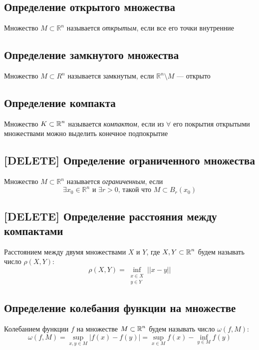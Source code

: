 \documentclass[a4paper]{article}
\begin{document}
\subsection{Определение открытого множества}
 Множество $M\subset\mathbb{R}^n$ называется \textit{открытым}, если все его точки внутренние

\subsection{Определение замкнутого множества}
 Множество $M\subset R^n$ называется замкнутым, если $\mathbb{R}^n\setminus M$ — открыто

\subsection{Определение компакта}
 Множество $K\subset\operatorname{\mathbb{R}}^n$ называется \textit{компактом}, если из $\forall$ его покрытия открытыми множествами можно выделить конечное подпокрытие

\subsection{[DELETE] Определение ограниченного множества}
 Множество $M\subset \mathbb{R}^n$ называется \textit{ограниченным}, если $$\exists x_0\in\mathbb{R}^n\text{ и }\exists r>0\text{, такой что }M\subset B_{r}(x_0)$$

\subsection{[DELETE] Определение расстояния между компактами}
 Расстоянием между двумя множествами $X$ и $Y$, где $X, Y \subset \operatorname{\mathbb{R}}^n$ будем называть число $\rho(X, Y)$:
\begin{equation*}
    \rho(X, Y) = \inf_{\substack{x\in X\\y\in{Y}}} ||x-y||
\end{equation*}

\subsection{Определение колебания функции на множестве}
 Колебанием функции $f$ на множестве $M\subset \operatorname{\mathbb{R}}^n$ будем называть число $\omega(f, M)$:
\begin{equation*}
    \omega(f, M) = \sup_{x, y\in M}|f(x) - f(y)| = \sup_{x\in M} f(x) - \inf_{y\in M} f(y)
\end{equation*}
\end{document}
